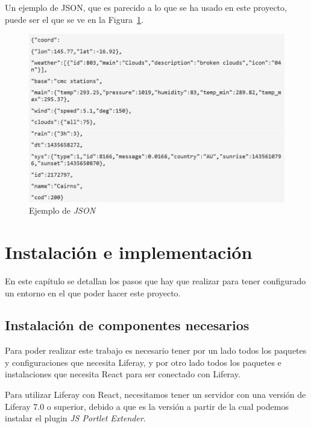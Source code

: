 \documentclass[a4paper, 12pt]{book}
\begin{document}
Un ejemplo de JSON, que es parecido a lo que se ha usado en este proyecto, puede ser el que se ve en la Figura~\ref{fig:json}.
\begin{figure}[t]
  \centering
  \includegraphics{img_usadas/JSONex.png}
  \caption{Ejemplo de \textit{JSON}}
  \label{fig:json}
\end{figure}



\cleardoublepage
\chapter{Instalación e implementación}
En este capítulo se detallan los pasos que hay que realizar para tener configurado un entorno en el que poder hacer este proyecto.

\section{Instalación de componentes necesarios}
\label{sec:instalacion-de-componentes-necesarios}
Para poder realizar este trabajo es necesario tener por un lado todos los paquetes y configuraciones que necesita Liferay, y por otro lado todos los paquetes e instalaciones que necesita React para ser conectado con Liferay. 

\vspace{5mm}
Para utilizar Liferay con React, necesitamos tener un servidor con una versión de Liferay 7.0 o superior, debido a que es la versión a partir de la cual podemos instalar el plugin \textit{JS Portlet Extender}.
\end{document}
